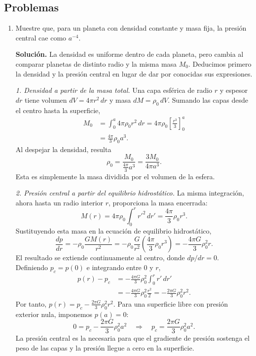 \figuraPresionTierra

\subsection{Problemas}

\begin{enumerate}
\item Muestre que, para un planeta con densidad constante y masa fija, la presión central cae como $a^{-4}$.

\textbf{Solución.} La densidad es uniforme dentro de cada planeta, pero cambia al comparar planetas de distinto radio y la misma masa $M_0$. Deducimos primero la densidad y la presión central en lugar de dar por conocidas sus expresiones.

\textit{1. Densidad a partir de la masa total.} Una capa esférica de radio $r$ y espesor $dr$ tiene volumen $dV=4\pi r^2\,dr$ y masa $dM=\rho_0\,dV$. Sumando las capas desde el centro hasta la superficie,
$$
\begin{aligned}
M_0
&=\int_0^a 4\pi\rho_0 r^2\,dr
=4\pi\rho_0\left[\frac{r^3}{3}\right]_0^a\\
&=\frac{4\pi}{3}\rho_0a^3.
\end{aligned}
$$
Al despejar la densidad, resulta
$$
\boxed{\rho_0=\frac{M_0}{\frac{4\pi}{3}a^3}
=\frac{3M_0}{4\pi a^3}}.
$$
Esta es simplemente la masa dividida por el volumen de la esfera.

\textit{2. Presión central a partir del equilibrio hidrostático.} La misma integración, ahora hasta un radio interior $r$, proporciona la masa encerrada:
$$
M(r)=4\pi\rho_0\int_0^r r'^2\,dr'
=\frac{4\pi}{3}\rho_0r^3.
$$
Sustituyendo esta masa en la ecuación de equilibrio hidrostático,
$$
\frac{dp}{dr}
=-\rho_0\frac{GM(r)}{r^2}
=-\rho_0\frac{G}{r^2}\left(\frac{4\pi}{3}\rho_0r^3\right)
=-\frac{4\pi G}{3}\rho_0^2r.
$$
El resultado se extiende continuamente al centro, donde $dp/dr=0$. Definiendo $p_c=p(0)$ e integrando entre $0$ y $r$,
$$
\begin{aligned}
p(r)-p_c
&=-\frac{4\pi G}{3}\rho_0^2\int_0^r r'\,dr'\\
&=-\frac{4\pi G}{3}\rho_0^2\frac{r^2}{2}
=-\frac{2\pi G}{3}\rho_0^2r^2.
\end{aligned}
$$
Por tanto, $p(r)=p_c-\frac{2\pi G}{3}\rho_0^2r^2$. Para una superficie libre con presión exterior nula, imponemos $p(a)=0$:
$$
0=p_c-\frac{2\pi G}{3}\rho_0^2a^2
\quad\Longrightarrow\quad
\boxed{p_c=\frac{2\pi G}{3}\rho_0^2a^2}.
$$
La presión central es la necesaria para que el gradiente de presión sostenga el peso de las capas y la presión llegue a cero en la superficie.


\end{enumerate}
